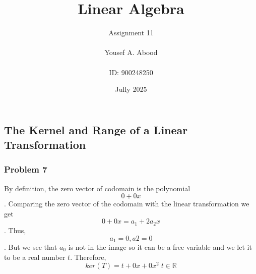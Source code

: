 \documentclass[a4paper,12pt]{article}
\title{Linear Algebra}
\author{Assignment 11\\ \\ Yousef A. Abood\\ \\ ID: 900248250}
\date{Jully 2025}
\begin{document}
\maketitle
\noindent\makebox[\linewidth]{\rule{15cm}{0.4pt}}
\subsection{The Kernel and Range of a Linear Transformation}
\subsubsection*{Problem 7}
By definition, the zero vector of codomain is the polynomial\[0+0x\]. Comparing the zero vector of the codomain with the linear transformation we get \[0+0x=a_1+2a_2x\]. Thus, \[a_1=0, a2=0\]. But we see that $a_0$ is not in the image so it can be a free variable and we let it to be a real number $t$.
Therefore, \[ker(T)={t+0x+0x^2| t \in \mathbb{R}}\]
\end{document}
